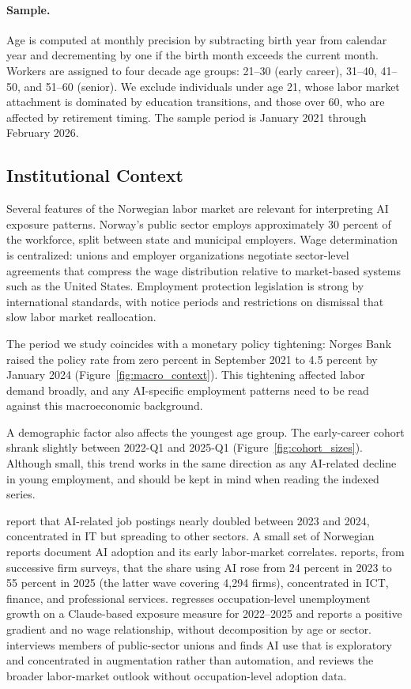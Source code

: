 \documentclass[12pt]{article}
\begin{document}
\paragraph{Sample.}
Age is computed at monthly precision by subtracting birth year from calendar year and decrementing by one if the birth month exceeds the current month. Workers are assigned to four decade age groups: 21--30 (early career), 31--40, 41--50, and 51--60 (senior). We exclude individuals under age 21, whose labor market attachment is dominated by education transitions, and those over 60, who are affected by retirement timing. The sample period is January 2021 through February 2026.


\subsection{Institutional Context}\label{sec:data:institutions}

Several features of the Norwegian labor market are relevant for interpreting AI exposure patterns. Norway's public sector employs approximately 30 percent of the workforce, split between state and municipal employers. Wage determination is centralized: unions and employer organizations negotiate sector-level agreements that compress the wage distribution relative to market-based systems such as the United States. Employment protection legislation is strong by international standards, with notice periods and restrictions on dismissal that slow labor market reallocation.

The period we study coincides with a monetary policy tightening: Norges Bank raised the policy rate from zero percent in September 2021 to 4.5 percent by January 2024 (Figure~\ref{fig:macro_context}). This tightening affected labor demand broadly, and any AI-specific employment patterns need to be read against this macroeconomic background.

A demographic factor also affects the youngest age group. The early-career cohort shrank slightly between 2022-Q1 and 2025-Q1 (Figure~\ref{fig:cohort_sizes}). Although small, this trend works in the same direction as any AI-related decline in young employment, and should be kept in mind when reading the indexed series.

\cite{kompetansebehovsutvalget2026} report that AI-related job postings nearly doubled between 2023 and 2024, concentrated in IT but spreading to other sectors. A small set of Norwegian reports document AI adoption and its early labor-market correlates. \citet{samfunnsok2026} reports, from successive firm surveys, that the share using AI rose from 24 percent in 2023 to 55 percent in 2025 (the latter wave covering 4{,}294 firms), concentrated in ICT, finance, and professional services. \citet{menon2026} regresses occupation-level unemployment growth on a Claude-based exposure measure for 2022--2025 and reports a positive gradient and no wage relationship, without decomposition by age or sector. \citet{nifu2024} interviews members of public-sector unions and finds AI use that is exploratory and concentrated in augmentation rather than automation, and \citet{nav2025} reviews the broader labor-market outlook without occupation-level adoption data.
\end{document}
